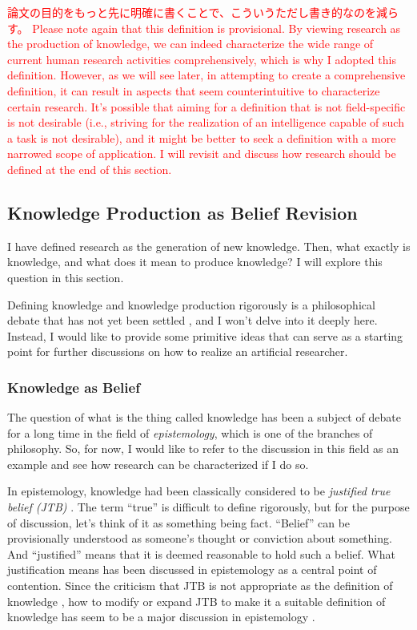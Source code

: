 \textcolor{red}{
論文の目的をもっと先に明確に書くことで、こういうただし書き的なのを減らす。
Please note again that this definition is provisional. By viewing research as the production of knowledge, we can indeed characterize the wide range of current human research activities comprehensively, which is why I adopted this definition. However, as we will see later, in attempting to create a comprehensive definition, it can result in aspects that seem counterintuitive to characterize certain research. It's possible that aiming for a definition that is not field-specific is not desirable (i.e., striving for the realization of an intelligence capable of such a task is not desirable), and it might be better to seek a definition with a more narrowed scope of application. I will revisit and discuss how research should be defined at the end of this section.
}

\subsection{Knowledge Production as Belief Revision}
\label{section-knowledge-production-as-belief-revision}
I have defined research as the generation of new knowledge. Then, what exactly is knowledge, and what does it mean to produce knowledge? I will explore this question in this section. 

Defining knowledge and knowledge production rigorously is a philosophical debate that has not yet been settled \cite{sep-epistemology}, and I won't delve into it deeply here. Instead, I would like to provide some primitive ideas that can serve as a starting point for further discussions on how to realize an artificial researcher.

\subsubsection{Knowledge as Belief}
The question of what is the thing called knowledge has been a subject of debate for a long time in the field of \textit{epistemology}, which is one of the branches of philosophy. So, for now, I would like to refer to the discussion in this field as an example and see how research can be characterized if I do so.

In epistemology, knowledge had been classically considered to be \textit{justified true belief (JTB)} \cite{sep-epistemology}. The term ``true'' is difficult to define rigorously, but for the purpose of discussion, let's think of it as something being fact. ``Belief'' can be provisionally understood as someone's thought or conviction about something. And ``justified'' means that it is deemed reasonable to hold such a belief. What justification means has been discussed in epistemology as a central point of contention. Since the criticism that JTB is not appropriate as the definition of knowledge \cite{gettier1963justified}, how to modify or expand JTB to make it a suitable definition of knowledge has seem to be a major discussion in epistemology \cite{sep-epistemology}. 

